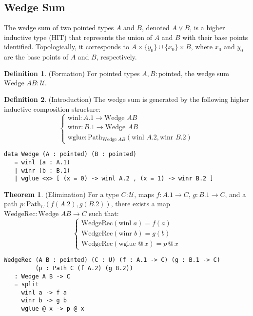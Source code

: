 \documentclass{article}
\theoremstyle{definition}
\newtheorem{theorem}{Theorem}
\newtheorem{definition}{Definition}
\begin{document}
\newpage
\subsection{Wedge Sum}
The wedge sum of two pointed types $A$ and $B$, denoted $A \vee B$,
is a higher inductive type (HIT) that represents the union of $A$
and $B$ with their base points identified. Topologically,
it corresponds to $A \times \{ y_0 \} \cup \{ x_0 \} \times B$,
where $x_0$ and $y_0$ are the base points of $A$ and $B$, respectively.

\begin{definition} (Formation)
For pointed types $A, B : \text{pointed}$, the wedge sum $\text{Wedge } A B : \mathcal{U}$.
\end{definition}

\begin{definition} (Introduction)
The wedge sum is generated by the following higher inductive composition structure:
\[
\begin{cases}
\text{winl} : A.1 \to \text{Wedge } A B \\
\text{winr} : B.1 \to \text{Wedge } A B \\
\text{wglue} : \text{Path}_{\text{Wedge } A B} (\text{winl } A.2, \text{winr } B.2)
\end{cases}
\]
\begin{lstlisting}
data Wedge (A : pointed) (B : pointed)
   = winl (a : A.1)
   | winr (b : B.1)
   | wglue <x> [ (x = 0) -> winl A.2 , (x = 1) -> winr B.2 ]
\end{lstlisting}
\end{definition}

\begin{theorem} (Elimination)
For a type $C : \mathcal{U}$, maps $f : A.1 \to C$, $g : B.1 \to C$, and a path $p : \text{Path}_C (f (A.2), g (B.2))$, there exists a map $\text{WedgeRec} : \text{Wedge } A B \to C$ such that:
\[
\begin{cases}
\text{WedgeRec}(\text{winl } a) = f(a) \\
\text{WedgeRec}(\text{winr } b) = g(b) \\
\text{WedgeRec}(\text{wglue } @ \, x) = p \, @ \, x
\end{cases}
\]
\begin{lstlisting}
WedgeRec (A B : pointed) (C : U) (f : A.1 -> C) (g : B.1 -> C)
         (p : Path C (f A.2) (g B.2))
   : Wedge A B -> C
   = split
     winl a -> f a
     winr b -> g b
     wglue @ x -> p @ x
\end{lstlisting}
\end{theorem}
\end{document}
